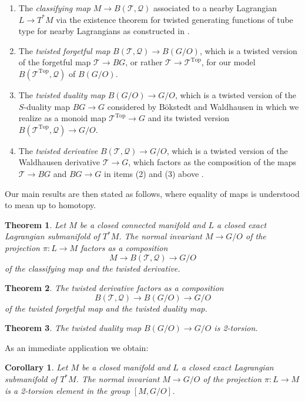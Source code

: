 \documentclass[reqno]{amsart}
\theoremstyle{theorem}
\newtheorem{theorem}{Theorem}
\newtheorem{corollary}{Corollary}[section]
\theoremstyle{remark}
\theoremstyle{definition}
\newcommand{\T}{\mathcal{T}}
\newcommand{\QQ}{\mathcal{Q}}
\newcommand{\TOP}{\mathrm{Top}}
\begin{document}
\begin{enumerate}
\item The {\em classifying map} $M \to B(\T,\QQ)$ associated to a nearby Lagrangian $L \to T^*M$ via the existence theorem for twisted generating functions of tube type for nearby Lagrangians as constructed in \cite{ACGK}.%
\item The {\em twisted forgetful map} $B(\T,\QQ) \to B(G/O)$, which is a twisted version of the forgetful map $\T \to BG$, or rather $\T \to \T^\TOP$, for our model $B(\T^\TOP, \QQ)$ of $B(G/O)$.
\item The {\em twisted duality map} $B(G/O) \to G/O$, which is a twisted version of the $S$-duality map $BG \to G$ considered by B\"okstedt and Waldhausen in \cite{BW88}  which we realize as a monoid map $\T^\TOP \to G$ and its twisted version $B(\T^\TOP, \QQ) \to G/O$.
\item The  {\em twisted derivative} $B(\T,\QQ) \to G/O$, which is a twisted version of the  Waldhausen derivative $\T \to G$, which factors as the composition of the maps $\T \to BG$ and $BG \to G$ in items (2) and (3) above \cite{W82,BW88}. 
\end{enumerate}


Our main results are then stated as follows, where equality of maps is understood to mean up to homotopy. 


\begin{theorem}\label{thm:main derivative}
Let $M$ be a closed connected manifold and $L$ a closed exact Lagrangian submanifold of $T^*M$.
The normal invariant $M\to G/O$ of the projection $\pi\colon L\to M$ factors as a composition
\[M \to B(\T,\QQ) \to G/O\]
of the classifying map and the twisted derivative.
\end{theorem}


\begin{theorem}\label{thm:main duality}
The twisted derivative factors as a composition
\[ B(\T,\QQ) \to B(G/O) \to  G/O\]
of the twisted forgetful map and the twisted duality map. 
\end{theorem}


\begin{theorem}\label{thm:main torsion}
The twisted duality map $B(G/O) \to G/O$ is 2-torsion.
\end{theorem}


As an immediate application we obtain:


\begin{corollary}\label{cor:main torsion}
Let $M$ be a closed manifold and $L$ a closed exact Lagrangian submanifold of $T^*M$.
The normal invariant $M\to G/O$ of the projection $\pi\colon L\to M$ is a 2-torsion element in the group $[M,G/O]$.
\end{corollary}
\end{document}
